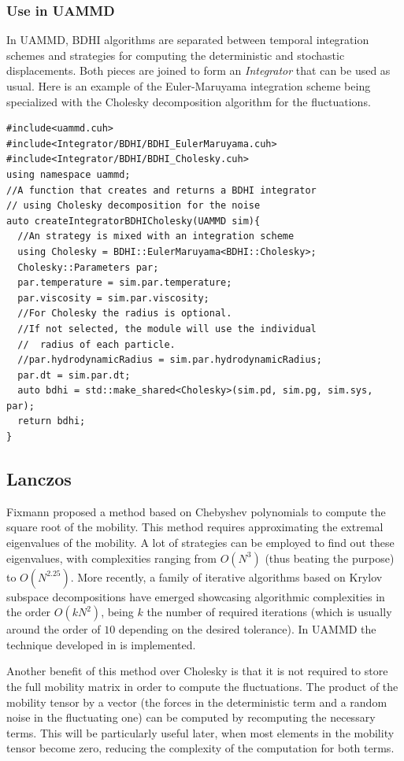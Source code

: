 \documentclass[ twoside,openright,titlepage,numbers=noenddot,%
headinclude,footinclude,cleardoublepage=empty,abstract=on,
BCOR=5mm,paper=a4,fontsize=11pt, dvipsnames
]{scrreprt}
\def\ucpp{uammd_cpp_lexer.py:UAMMDCppLexer -x}
\newcommand{\uammd}{\gls{UAMMD}\xspace}
\begin{document}
\subsubsection*{Use in UAMMD}\label{sec:uammdchol}
In \uammd, \gls{BDHI} algorithms are separated between temporal integration schemes and strategies for computing the deterministic and stochastic displacements. Both pieces are joined to form an \emph{Integrator} that can be used as usual.
Here is an example of the Euler-Maruyama integration scheme being specialized with the Cholesky decomposition algorithm for the fluctuations.
\begin{verbatim}
#include<uammd.cuh>
#include<Integrator/BDHI/BDHI_EulerMaruyama.cuh>
#include<Integrator/BDHI/BDHI_Cholesky.cuh>
using namespace uammd;
//A function that creates and returns a BDHI integrator
// using Cholesky decomposition for the noise
auto createIntegratorBDHICholesky(UAMMD sim){   
  //An strategy is mixed with an integration scheme
  using Cholesky = BDHI::EulerMaruyama<BDHI::Cholesky>;
  Cholesky::Parameters par;
  par.temperature = sim.par.temperature;
  par.viscosity = sim.par.viscosity;
  //For Cholesky the radius is optional.
  //If not selected, the module will use the individual 
  //  radius of each particle.
  //par.hydrodynamicRadius = sim.par.hydrodynamicRadius;
  par.dt = sim.par.dt;
  auto bdhi = std::make_shared<Cholesky>(sim.pd, sim.pg, sim.sys, par);
  return bdhi;
}
\end{verbatim}


\subsection{Lanczos}\label{sec:lanczos}
Fixmann proposed a method based on Chebyshev polynomials\cite{Fixman1986} to compute the square root of the mobility. This method requires approximating the extremal eigenvalues of the mobility. A lot of strategies can be employed to find out these eigenvalues, with complexities ranging from $O(N^3)$ (thus beating the purpose) to $O(N^{2.25})$\cite{Jendrejack2000}. More recently, a family of iterative algorithms based on Krylov subspace decompositions have emerged\cite{Ando2012,Saadat2014} showcasing algorithmic complexities in the order $O(kN^2)$, being $k$ the number of required iterations (which is usually around the order of $10$ depending on the desired tolerance). In \uammd the technique developed in \cite{Ando2012} is implemented.

Another benefit of this method over Cholesky is that it is not required to store the full mobility matrix in order to compute the fluctuations. The product of the mobility tensor by a vector (the forces in the deterministic term and a random noise in the fluctuating one) can be computed by recomputing the necessary terms. This will be particularly useful later, when most elements in the mobility tensor become zero, reducing the complexity of the computation for both terms.
\end{document}
